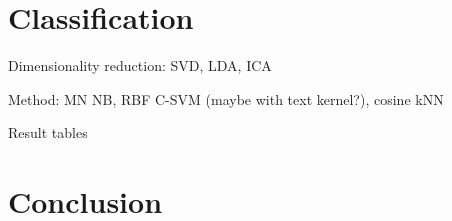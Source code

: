 \section{Classification}
Dimensionality reduction: SVD, LDA, ICA

Method: MN NB, RBF C-SVM (maybe with text kernel?), cosine kNN

Result tables

\section{Conclusion}
